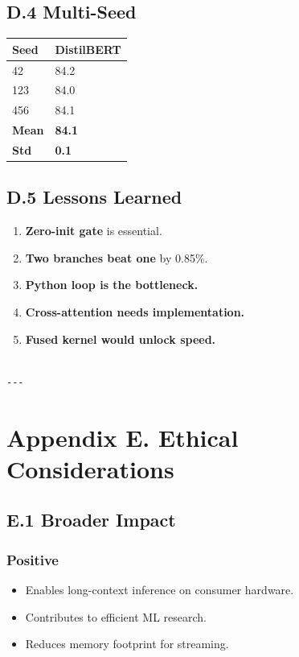 \subsection{D.4 Multi-Seed}

\begin{table}[H]
\centering
\small
\begin{tabular}{ll}
\toprule
\textbf{Seed} & \textbf{DistilBERT} \\
\midrule
42 & 84.2 \\
123 & 84.0 \\
456 & 84.1 \\
\textbf{Mean} & \textbf{84.1} \\
\textbf{Std} & \textbf{0.1} \\
\bottomrule
\end{tabular}
\end{table}

\subsection{D.5 Lessons Learned}

\begin{enumerate}
\item \textbf{Zero-init gate} is essential.
\item \textbf{Two branches beat one} by 0.85\%.
\item \textbf{Python loop is the bottleneck.}
\item \textbf{Cross-attention needs implementation.}
\item \textbf{Fused kernel would unlock speed.}
\end{enumerate}
\begin{lstlisting}

---
\end{lstlisting}

\section{Appendix E. Ethical Considerations}

\subsection{E.1 Broader Impact}

\subsubsection{Positive}
\begin{itemize}
\item Enables long-context inference on consumer hardware.
\item Contributes to efficient ML research.
\item Reduces memory footprint for streaming.

\end{itemize}
